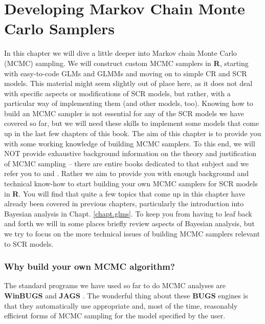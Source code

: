 \chapter{
Developing Markov Chain Monte Carlo Samplers
}
\label{chapt.mcmc}



\vspace{.3in}

In this chapter we will dive a little deeper into Markov chain Monte
Carlo (MCMC) sampling. We will construct custom MCMC samplers in {\bf
  R}, starting with easy-to-code GLMs and GLMMs and moving on to
simple CR and SCR models. This material might seem slightly out of place here, as it does not deal with specific aspects or modifications of SCR models, but rather, with a particular way of implementing them (and other models, too). Knowing how to build an MCMC sampler is not essential for any of the SCR models we have covered so far, but we will need these skills to implement some models that come up in the last few chapters of this book. The aim of this chapter is to provide you with some working knowledge of building MCMC samplers. To this end, we will NOT provide
exhaustive background information on the theory and justification of
MCMC sampling -- there are entire books dedicated to that subject and
we refer you to \citet{robert_casella:2004} and
\citet{robert_casella:2010}. Rather we aim to provide you with enough
background and technical know-how to start building your own MCMC
samplers for SCR models in {\bf R}. You will find that quite a few
topics that come up in this chapter have already been covered in
previous chapters, particularly the introduction into Bayesian
analysis in Chapt. \ref{chapt.glms}. To keep you from having to leaf
back and forth we will in some places briefly review aspects of
Bayesian analysis, but we try to focus on the more technical issues of
building MCMC samplers relevant to SCR models.



\subsection{Why build your own MCMC algorithm?}

The standard programs we have used so far to do MCMC analyses are
{\bf WinBUGS} \citep{gilks_etal:1994} and {\bf JAGS}
\citep{plummer:2003}. The wonderful thing about these {\bf BUGS}
engines
is that they automatically use  appropriate and, most of the time, reasonably
efficient forms
of MCMC sampling for the model specified by the user.

